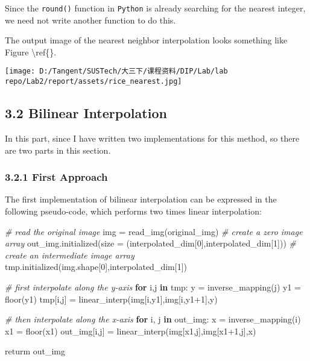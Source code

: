 \documentclass[
]{article}
\newenvironment{Shaded}{}{}
\newcommand{\CommentTok}[1]{\textcolor[rgb]{0.38,0.63,0.69}{\textit{#1}}}
\newcommand{\ControlFlowTok}[1]{\textcolor[rgb]{0.00,0.44,0.13}{\textbf{#1}}}
\newcommand{\DecValTok}[1]{\textcolor[rgb]{0.25,0.63,0.44}{#1}}
\newcommand{\KeywordTok}[1]{\textcolor[rgb]{0.00,0.44,0.13}{\textbf{#1}}}
\newcommand{\NormalTok}[1]{#1}
\newcommand{\OperatorTok}[1]{\textcolor[rgb]{0.40,0.40,0.40}{#1}}
\begin{document}
Since the \texttt{round()} function in \texttt{Python} is already
searching for the nearest integer, we need not write another function to
do this.

The output image of the nearest neighbor interpolation looks something
like Figure \textbackslash ref\{\}.

\texttt{[image: D:/Tangent/SUSTech/大三下/课程资料/DIP/Lab/lab repo/Lab2/report/assets/rice\_nearest.jpg]}

\hypertarget{32-bilinear-interpolation}{%
\subsection{3.2 Bilinear
Interpolation}\label{32-bilinear-interpolation}}

In this part, since I have written two implementations for this method,
so there are two parts in this section.

\hypertarget{321-first-approach}{%
\subsubsection{3.2.1 First Approach}\label{321-first-approach}}

The first implementation of bilinear interpolation can be expressed in
the following pseudo-code, which performs two times linear
interpolation:

\begin{Shaded}
\begin{Highlighting}[]
\CommentTok{\# read the original image}
\NormalTok{img }\OperatorTok{=}\NormalTok{ read\_img(original\_img)}
\CommentTok{\# create a zero image array}
\NormalTok{out\_img.initialized(size }\OperatorTok{=}\NormalTok{ (interpolated\_dim[}\DecValTok{0}\NormalTok{],interpolated\_dim[}\DecValTok{1}\NormalTok{]))}
\CommentTok{\# create an intermediate image array}
\NormalTok{tmp.initialized(img.shape[}\DecValTok{0}\NormalTok{],interpolated\_dim[}\DecValTok{1}\NormalTok{])}

\CommentTok{\# first interpolate along the y{-}axis}
\ControlFlowTok{for}\NormalTok{ i,j }\KeywordTok{in}\NormalTok{ tmp:}
\NormalTok{    y }\OperatorTok{=}\NormalTok{ inverse\_mapping(j)}
\NormalTok{    y1 }\OperatorTok{=}\NormalTok{ floor(y1)}
\NormalTok{    tmp[i,j] }\OperatorTok{=}\NormalTok{ linear\_interp(img[i,y1],img[i,y1}\OperatorTok{+}\DecValTok{1}\NormalTok{],y)}

\CommentTok{\# then interpolate along the x{-}axis}
\ControlFlowTok{for}\NormalTok{ i, j }\KeywordTok{in}\NormalTok{ out\_img:}
\NormalTok{    x }\OperatorTok{=}\NormalTok{ inverse\_mapping(i)}
\NormalTok{    x1 }\OperatorTok{=}\NormalTok{ floor(x1)}
\NormalTok{    out\_img[i,j] }\OperatorTok{=}\NormalTok{ linear\_interp(img[x1,j],img[x1}\OperatorTok{+}\DecValTok{1}\NormalTok{,j],x)}

\NormalTok{returm out\_img}
\end{Highlighting}
\end{Shaded}
\end{document}
